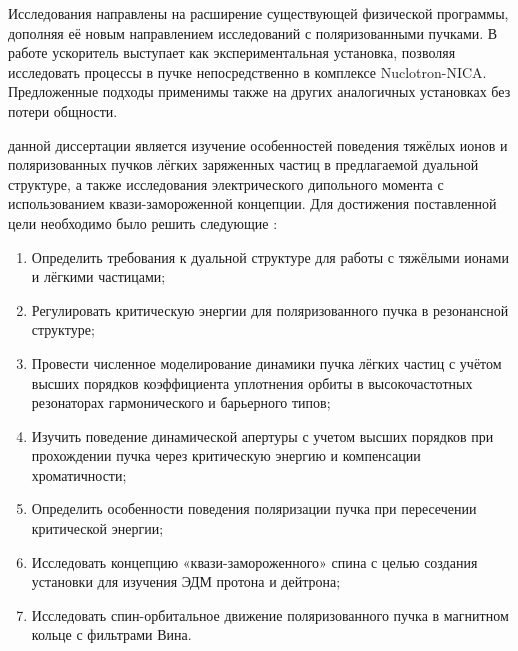 \par Исследования направлены на расширение существующей физической программы, дополняя её новым направлением исследований с поляризованными пучками. В работе ускоритель выступает как экспериментальная установка, позволяя исследовать процессы в пучке непосредственно в комплексе Nuclotron-NICA. Предложенные подходы применимы также на других аналогичных установках без потери общности.
~\\
\par {\aim} данной диссертации является изучение особенностей поведения тяжёлых ионов и поляризованных пучков лёгких заряженных частиц в предлагаемой дуальной структуре, а также исследования электрического дипольного момента с использованием квази-замороженной концепции.
Для достижения поставленной цели необходимо было решить следующие {\tasks}:
\begin{enumerate}[beginpenalty=10000] %
	\item	Определить требования к дуальной структуре для работы с тяжёлыми ионами и лёгкими частицами;
	\item	Регулировать критическую энергии для поляризованного пучка в резонансной структуре;
	\item	Провести численное моделирование динамики пучка лёгких частиц с учётом высших порядков коэффициента уплотнения орбиты в высокочастотных резонаторах гармонического и барьерного типов;
	\item 	Изучить поведение динамической апертуры с учетом высших порядков при прохождении пучка через критическую энергию и компенсации хроматичности;
	\item 	Определить особенности поведения поляризации пучка при пересечении критической энергии;
	\item 	Исследовать концепцию «квази-замороженного» спина с целью создания установки для изучения ЭДМ протона и дейтрона;
	\item	Исследовать спин-орбитальное движение поляризованного пучка в магнитном кольце с фильтрами Вина.
\end{enumerate}
~\\
\par {\novelty}
